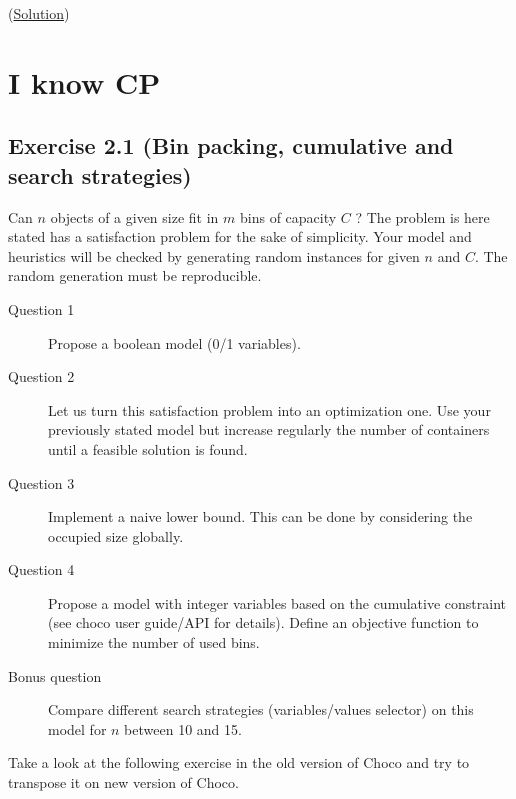 
(\hyperlink{solutions:solutionofexercise1.5}{Solution})

\section{I know CP}\label{exercises:iknowcp}\hypertarget{exercises:iknowcp}{}

\subsection{Exercise 2.1 (Bin packing, cumulative and search strategies)}\label{exercises:exercise2.1}\hypertarget{exercises:exercise2.1}{}

Can $n$ objects of a given size fit in $m$ bins of capacity $C$ ? The problem is here stated has a satisfaction problem for the sake of simplicity. Your model and heuristics will be checked by generating random instances for given $n$ and $C$. The random generation must be reproducible.
\begin{description}
	\item[Question 1] Propose a boolean model (0/1 variables).
	\item[Question 2] Let us turn this satisfaction problem into an optimization one. Use your previously stated model but increase regularly the number of containers until a feasible solution is found.
	\item[Question 3] Implement a naive lower bound. This can be done by considering the occupied size globally.
	\item[Question 4] Propose a model with integer variables based on the cumulative constraint (see choco user guide/API for details). Define an objective function to minimize the number of used bins.
	\item[Bonus question] Compare different search strategies (variables/values selector) on this model for $n$ between 10 and 15.
\end{description}

Take a look at the following exercise in the old version of Choco and try to transpose it on new version of Choco.

